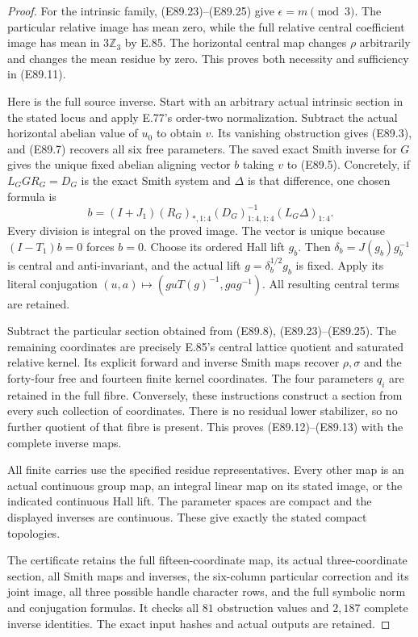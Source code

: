 \begin{proof}
For the intrinsic family, (E89.23)--(E89.25)
give $\epsilon=m\pmod3$. The particular
relative image has mean zero, while the
full relative central coefficient image
has mean in $3\mathbb Z_3$ by E.85.
The horizontal central map changes $\rho$
arbitrarily and changes the mean residue
by zero. This proves both necessity and
sufficiency in (E89.11).

Here is the full source inverse. Start
with an arbitrary actual intrinsic
section in the stated locus and apply
E.77's order-two normalization. Subtract
the actual horizontal abelian value of
$u_0$ to obtain $v$. Its vanishing
obstruction gives (E89.3), and (E89.7)
recovers all six free parameters. The
saved exact Smith inverse for $G$ gives
the unique fixed abelian aligning vector
$b$ taking $v$ to (E89.5). Concretely,
if $L_G G R_G=D_G$ is the exact Smith
system and $\Delta$ is that difference,
one chosen formula is
\[
 b=(I+J_1)(R_G)_{*,1:4}
           (D_G)_{1:4,1:4}^{-1}(L_G\Delta)_{1:4}.
 \tag{E89.31}
\]
Every division is integral on the proved
image. The vector is unique because
$(I-T_1)b=0$ forces $b=0$.
Choose its ordered Hall lift $g_b$.
Then $\delta_b=J(g_b)g_b^{-1}$ is central
and anti-invariant, and the actual lift
$g=\delta_b^{1/2}g_b$ is fixed. Apply
its literal conjugation
$(u,a)\mapsto(guT(g)^{-1},gag^{-1})$.
All resulting central terms are retained.

Subtract the particular section obtained
from (E89.8), (E89.23)--(E89.25). The
remaining coordinates are precisely
E.85's central lattice quotient and
saturated relative kernel. Its explicit
forward and inverse Smith maps recover
$\rho,\sigma$ and the forty-four free
and fourteen finite kernel coordinates.
The four parameters $q_i$ are retained
in the full fibre. Conversely, these
instructions construct a section from
every such collection of coordinates.
There is no residual lower stabilizer,
so no further quotient of that fibre
is present. This proves (E89.12)--(E89.13)
with the complete inverse maps.

All finite carries use the specified
residue representatives. Every other
map is an actual continuous group map,
an integral linear map on its stated
image, or the indicated continuous
Hall lift. The parameter spaces are
compact and the displayed inverses
are continuous. These give exactly
the stated compact topologies.

The certificate retains the full
fifteen-coordinate map, its actual
three-coordinate section, all Smith
maps and inverses, the six-column
particular correction and its joint
image, all three possible handle
character rows, and the full symbolic
norm and conjugation formulas. It
checks all $81$ obstruction values
and $2,187$ complete inverse identities.
The exact input hashes and actual
outputs are retained.
\end{proof}
